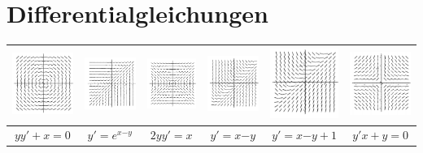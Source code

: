 
\section*{Differentialgleichungen}

\begin{tabular}{|c|c|c|c|c|c|}
\hline 
\includegraphics[width=3cm]{differentialgleichungen/rf1} & \includegraphics[width=3cm]{differentialgleichungen/rf2} & \includegraphics[width=3cm]{differentialgleichungen/rf3} & \includegraphics[width=3cm]{differentialgleichungen/rf4} & \includegraphics[width=3cm]{differentialgleichungen/rf5} & \includegraphics[width=3cm]{differentialgleichungen/rf6}\tabularnewline
\hline 
\hline 
$yy'+x=0$ & $y'=e^{x\text{−}y}$ & $2yy'=x$ & $y'=x\text{−}y$ & $y'=x\text{−}y+1$ & $y'x+y=0$\tabularnewline
\hline 
\end{tabular}


